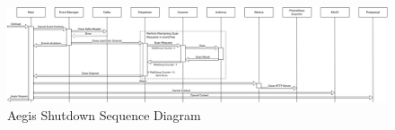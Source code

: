 \documentclass[12pt, conference, final, a4paper, onecolumn, compsoc]{IEEEtran}
\begin{document}
\begin{figure}[H]
  \centering \includegraphics[scale=0.31]{diagrams/shutdown-sequence.png}
  \caption{Aegis Shutdown Sequence Diagram}
  \label{appendix:shutdown-sequence}
\end{figure}



\bigskip 

\bigskip 

\bigskip 

\bigskip 

\bigskip

 
\end{document}
